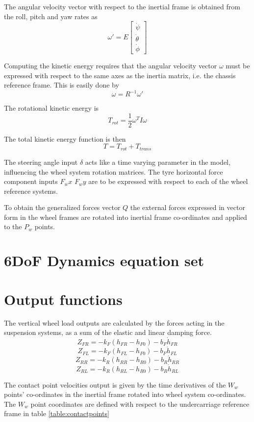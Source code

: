 The angular velocity vector with respect to the inertial frame is obtained from the roll, pitch and yaw rates as
$$
\omega' = E\begin{bmatrix}
\dot\psi \\
\dot\theta \\
\dot\phi
\end{bmatrix}
$$

Computing the kinetic energy requires that the angular velocity vector $\omega$ must be expressed with respect to the same axes as the inertia matrix, i.e. the chassis reference frame. This is easily done by
$$\omega = R^{-1}\omega'$$

The rotational kinetic energy is
$$ T_{rot} = \frac{1}{2}\omega^T I \omega $$

The total kinetic energy function is then
$$ T = T_{rot} + T_{trans} $$

The steering angle input $\delta$ acts like a time varying parameter in the model, influencing the wheel system rotation matrices.
The tyre horizontal force component inputs $F_wx$ $F_wy$ are to be expressed with respect to each of the wheel reference systems.

To obtain the generalized forces vector $Q$ the external forces expressed in vector form in the wheel frames are rotated into inertial frame co-ordinates and applied to the $P_w$ points.

\section{6DoF Dynamics equation set}
\label{sec:6dofeq}

\section{Output functions}
\label{sec:6dofout}
The vertical wheel load outputs are calculated by the forces acting in the suspension systems, as a sum of the elastic and linear damping force.
$$Z_{FR} = - k_F (h_{FR} - h_{F0}) - b_F \dot h_{FR} $$
$$Z_{FL} = - k_F (h_{FL} - h_{F0}) - b_F \dot h_{FL} $$
$$Z_{RR} = - k_R (h_{RR} - h_{R0}) - b_R \dot h_{RR} $$
$$Z_{RL} = - k_R (h_{RL} - h_{R0}) - b_R \dot h_{RL} $$

The contact point velocities output is given by the time derivatives of the $W_w$ points' co-ordinates in the inertial frame rotated into wheel system co-ordinates. The $W_w$ point coordinates are defined with respect to the undercarriage reference frame in table \ref{table:contactpoints}

